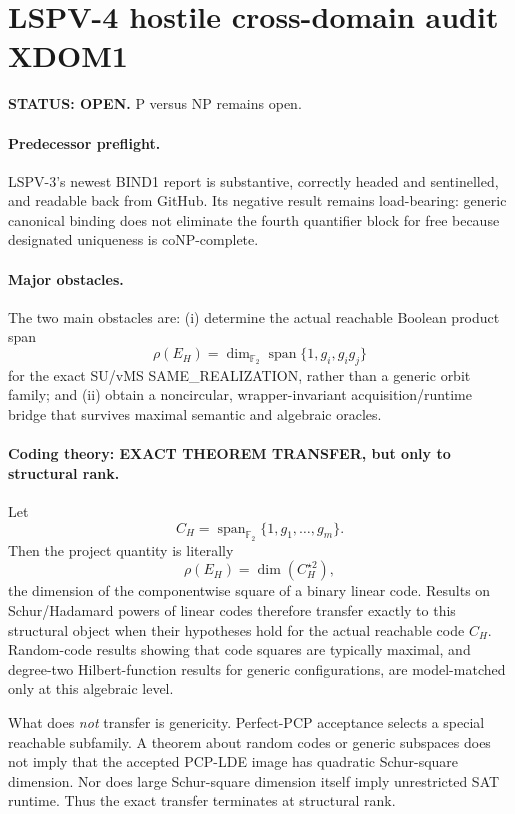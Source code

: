\documentclass[11pt]{article}
\begin{document}
\section*{LSPV-4 hostile cross-domain audit XDOM1}
\textbf{STATUS: OPEN.} P versus NP remains open.

\paragraph{Predecessor preflight.}
LSPV-3's newest BIND1 report is substantive, correctly headed and sentinelled, and readable back from GitHub. Its negative result remains load-bearing: generic canonical binding does not eliminate the fourth quantifier block for free because designated uniqueness is coNP-complete.

\paragraph{Major obstacles.}
The two main obstacles are: (i) determine the actual reachable Boolean product span
\[
\rho(E_H)=\dim_{\mathbb F_2}\operatorname{span}\{1,g_i,g_i g_j\}
\]
for the exact SU/vMS SAME\_REALIZATION, rather than a generic orbit family; and (ii) obtain a noncircular, wrapper-invariant acquisition/runtime bridge that survives maximal semantic and algebraic oracles.

\paragraph{Coding theory: EXACT THEOREM TRANSFER, but only to structural rank.}
Let
\[
C_H=\operatorname{span}_{\mathbb F_2}\{1,g_1,\ldots,g_m\}.
\]
Then the project quantity is literally
\[
\rho(E_H)=\dim(C_H^{\star 2}),
\]
the dimension of the componentwise square of a binary linear code. Results on Schur/Hadamard powers of linear codes therefore transfer exactly to this structural object when their hypotheses hold for the actual reachable code $C_H$. Random-code results showing that code squares are typically maximal, and degree-two Hilbert-function results for generic configurations, are model-matched only at this algebraic level.

What does \emph{not} transfer is genericity. Perfect-PCP acceptance selects a special reachable subfamily. A theorem about random codes or generic subspaces does not imply that the accepted PCP-LDE image has quadratic Schur-square dimension. Nor does large Schur-square dimension itself imply unrestricted SAT runtime. Thus the exact transfer terminates at structural rank.
\end{document}
